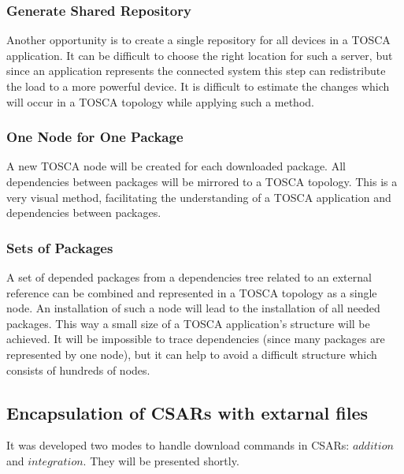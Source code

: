 \subsubsection*{Generate Shared Repository}
Another opportunity is to create a single repository for all devices in a TOSCA application.
It can be difficult to choose the right location for such a server, but since an application represents the connected system this step can redistribute the load to a more powerful device.
It is difficult to estimate the changes which will occur in a TOSCA topology while applying such a method.
\subsubsection*{One Node for One Package}
A new TOSCA node will be created for each downloaded package. 
All dependencies between packages will be mirrored to a TOSCA topology.
This is a very visual method, facilitating the understanding of a TOSCA application and dependencies between packages.
\subsubsection*{Sets of Packages} \label{mode:setsofpkg}
A set of depended packages from a dependencies tree related to an external reference can be combined and represented in a TOSCA topology as a single node.
An installation of such a node will lead to the installation of all needed packages.
This way a small size of a TOSCA application's structure will be achieved.
It will be impossible to trace dependencies (since many packages are represented by one node), but it can help to avoid a difficult structure which consists of hundreds of nodes. 

\subsection{Encapsulation of CSARs with extarnal files}
It was developed two modes to handle download commands in CSARs: $addition$ and $integration$.
They will be presented shortly.

